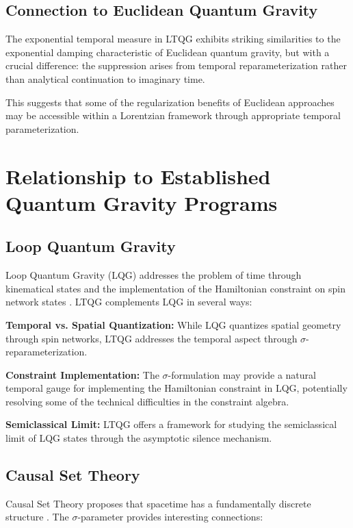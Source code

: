 \documentclass[12pt,a4paper]{article}
\begin{document}
\subsection{Connection to Euclidean Quantum Gravity}

The exponential temporal measure in LTQG exhibits striking similarities to the exponential damping characteristic of Euclidean quantum gravity, but with a crucial difference: the suppression arises from temporal reparameterization rather than analytical continuation to imaginary time.

This suggests that some of the regularization benefits of Euclidean approaches may be accessible within a Lorentzian framework through appropriate temporal parameterization.

\section{Relationship to Established Quantum Gravity Programs}

\subsection{Loop Quantum Gravity}

Loop Quantum Gravity (LQG) addresses the problem of time through kinematical states and the implementation of the Hamiltonian constraint on spin network states \cite{Rovelli2004}. LTQG complements LQG in several ways:

\textbf{Temporal vs. Spatial Quantization:} While LQG quantizes spatial geometry through spin networks, LTQG addresses the temporal aspect through $\sigma$-reparameterization.

\textbf{Constraint Implementation:} The $\sigma$-formulation may provide a natural temporal gauge for implementing the Hamiltonian constraint in LQG, potentially resolving some of the technical difficulties in the constraint algebra.

\textbf{Semiclassical Limit:} LTQG offers a framework for studying the semiclassical limit of LQG states through the asymptotic silence mechanism.

\subsection{Causal Set Theory}

Causal Set Theory proposes that spacetime has a fundamentally discrete structure \cite{Bombelli1987}. The $\sigma$-parameter provides interesting connections:
\end{document}
